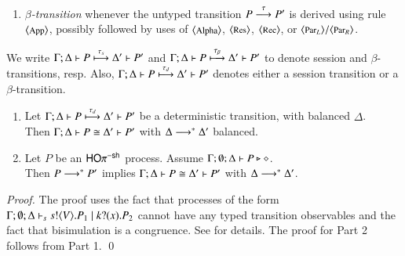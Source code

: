 {\begin{definition}
\begin{enumerate}[$-$]
		\item	{\em $\beta$-transition}
				whenever the untyped transition $P \stackrel{\tau}{\longrightarrow} P'$
				is derived using rule ${\footnotesize \langle \textrm{App} \rangle}$,
				possibly followed by uses of  ${\footnotesize \langle \textrm{Alpha} \rangle}$, ${\footnotesize \langle \textrm{Res} \rangle}$, ${\footnotesize \langle \textrm{Rec} \rangle}$, or ${\footnotesize \langle \textrm{Par${}_L$} \rangle}/
				{\footnotesize \langle \textrm{Par${}_R$} \rangle}$.
	\end{enumerate}
%
	We write
	$\Gamma; \Delta \vdash P \stackrel{\tau_{s}}{\longmapsto} \Delta' \vdash P'$
	and 
	$\Gamma; \Delta \vdash P \stackrel{\tau_{\beta}}{\longmapsto} \Delta' \vdash P'$
	to denote session and $\beta$-transitions, resp. Also, 
	 $\Gamma; \Delta \vdash P \stackrel{\tau_{d}}{\longmapsto} \Delta' \vdash P'$ denotes
	either a session transition or a $\beta$-transition.
\end{definition}
%

\begin{lemma}\rm
	\label{lem:tau_inert}
	\begin{enumerate}[1)]
		\item
				Let $\Gamma; \Delta \vdash P \stackrel{\tau_{d}}{\longmapsto} \Delta' \vdash P'$ be a deterministic transition,
				with balanced $\Delta$. \\ Then 
				$\Gamma; \Delta \vdash P \cong \Delta'\vdash P'$ 
				with $\Delta \longrightarrow^\ast \Delta'$ balanced.

		\item 
				Let $P$ be an $\mathsf{HO}\pi^{-\mathsf{sh}}$ process. 
				Assume $\Gamma; \emptyset; \Delta \vdash P \triangleright \diamond$. \\ Then 
				$P \longrightarrow^\ast P'$ implies $\Gamma; \Delta \vdash 
				P \cong \Delta'\vdash P'$ with $\Delta \longrightarrow^\ast \Delta'$. 
	\end{enumerate}
\end{lemma}


\begin{proof}
	The proof uses the fact that processes of the
	form $\Gamma; \emptyset; \Delta \vdash_s s ! \langle V \rangle . P_1 \;|\; k ? (x) . P_2$
	cannot have any typed transition observables and the fact
	that bisimulation is a congruence.
	See   for details.
	The proof for Part 2 follows from Part 1.
	\qed
\end{proof}




}
